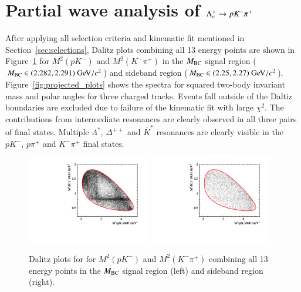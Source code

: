 \clearpage
\section{Partial wave analysis of $\Lambda_{c}^{+} \rightarrow p K^- \pi^+$}
\label{sec:pwa}

After applying all selection criteria and kinematic fit mentioned in Section~\ref{sec:selections}, Dalitz plots combining all 13 energy points are shown in Figure~\ref{fig:daltiz_plots} for $M^2(pK^-)$ and $M^2(K^-\pi^+)$ in the $M_{\rm{BC}}$ signal region ($\mbc \in (2.282, 2.291)\gev/c^2$) and sideband region ($\mbc \in (2.25, 2.27)\gev/c^2$). Figure~\ref{fig:projected_plots} shows the spectra for squared two-body invariant mass and polar angles for three charged tracks. Events fall outside of the Daltiz boundaries are excluded due to failure of the kinematic fit with large $\chi^2$.
The contributions from intermediate resonances are clearly observed in all three pairs of final states. Multiple $\Lambda^*$, $\Delta^{++}$ and $\overline{K}^*$ resonances are clearly visible in the $pK^-$, $p\pi^+$ and $K^-\pi^+$ final states. 

\begin{figure}[h]\centering
    \includegraphics[width=0.48\textwidth]{figure/dalitz/dalitz_Signal_total.pdf}
    \includegraphics[width=0.48\textwidth]{figure/dalitz/dalitz_Sideband_total.pdf}
    \caption{Dalitz plots for for $M^2(pK^-)$ and $M^2(K^-\pi^+)$ combining all 13 energy points in the $M_{\rm{BC}}$ signal region (left) and sideband region (right).}
\label{fig:daltiz_plots}
\end{figure}


